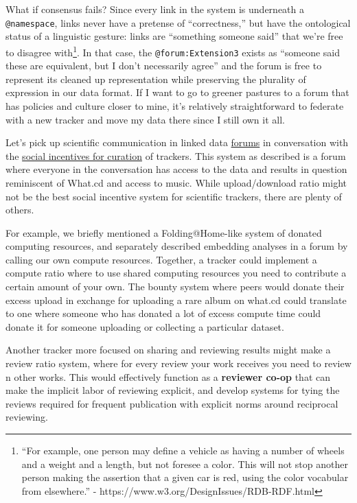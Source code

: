 \documentclass[10pt]{article}
\begin{document}
\begin{multicols}{2}
What if consensus fails? Since every link in the system is underneath a
\texttt{@namespace}, links never have a pretense of ``correctness,'' but
have the ontological status of a linguistic gesture: links are
``something someone said'' that we're free to disagree with\footnote{``For
  example, one person may define a vehicle as having a number of wheels
  and a weight and a length, but not foresee a color. This will not stop
  another person making the assertion that a given car is red, using the
  color vocabular from elsewhere.'' -
  https://www.w3.org/DesignIssues/RDB-RDF.html}. In that case, the
\texttt{@forum:Extension3} exists as ``someone said these are
equivalent, but I don't necessarily agree'' and the forum is free to
represent its cleaned up representation while preserving the plurality
of expression in our data format. If I want to go to greener pastures to
a forum that has policies and culture closer to mine, it's relatively
straightforward to federate with a new tracker and move my data there
since I still own it all.

Let's pick up scientific communication in linked data
\protect\hyperlink{forums--feeds}{forums} in conversation with the
\protect\hyperlink{archives-need-communities}{social incentives for
curation} of trackers. This system as described is a forum where
everyone in the conversation has access to the data and results in
question reminiscent of What.cd and access to music. While
upload/download ratio might not be the best social incentive system for
scientific trackers, there are plenty of others.

For example, we briefly mentioned a Folding@Home-like system of donated
computing resources, and separately described embedding analyses in a
forum by calling our own compute resources. Together, a tracker could
implement a compute ratio where to use shared computing resources you
need to contribute a certain amount of your own. The bounty system where
peers would donate their excess upload in exchange for uploading a rare
album on what.cd could translate to one where someone who has donated a
lot of excess compute time could donate it for someone uploading or
collecting a particular dataset.

Another tracker more focused on sharing and reviewing results might make
a review ratio system, where for every review your work receives you
need to review n other works. This would effectively function as a
\textbf{reviewer co-op} that can make the implicit labor of reviewing
explicit, and develop systems for tying the reviews required for
frequent publication with explicit norms around reciprocal reviewing.


\end{multicols}
\end{document}
